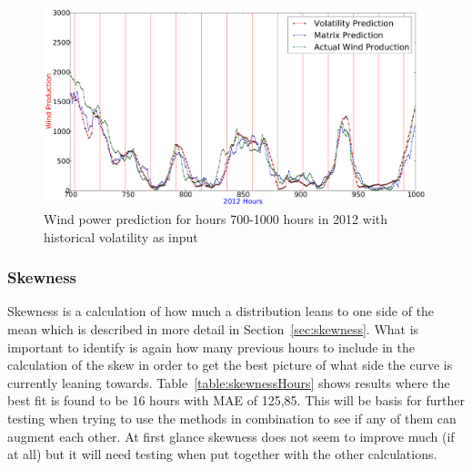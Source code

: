 \begin{figure}[H]
\centering
\includegraphics[width=0.99\textwidth]{billeder/volatilityBest700-1000.png}
\caption{Wind power prediction for hours 700-1000 hours in 2012 with historical volatility as input}
\label{fig:volatilityBest700-1000}
\end{figure} 

\subsubsection{Skewness}
Skewness is a calculation of how much a distribution leans to one side of the mean which is described in more detail in Section~\ref{sec:skewness}. What is important to identify is again how many previous hours to include in the calculation of the skew in order to get the best picture of what side the curve is currently leaning towards. Table~\ref{table:skewnessHours} shows results where the best fit is found to be 16 hours with MAE of 125,85. This will be basis for further testing when trying to use the methods in combination to see if any of them can augment each other. At first glance skewness does not seem to improve much (if at all) but it will need testing when put together with the other calculations.


